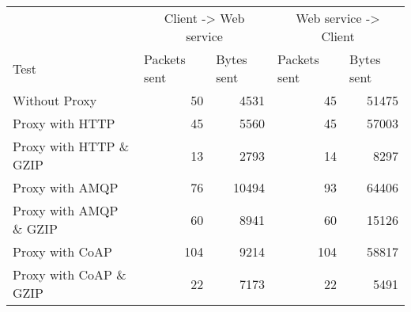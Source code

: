 \begin{tabular}{lrrrr}
\hline
\multicolumn{1}{l}{}                  & \multicolumn{2}{c}{Client -> Web service}                           & \multicolumn{2}{c}{Web service -> Client}                           \\
\multicolumn{1}{l}{Test} & \multicolumn{1}{l}{Packets sent} & \multicolumn{1}{l}{Bytes sent} & \multicolumn{1}{l}{Packets sent} & \multicolumn{1}{l}{Bytes sent} \\ \hline
Without Proxy                   & 50             & 4531           & 45             & 51475          \\
Proxy with HTTP                 & 45             & 5560           & 45             & 57003          \\
Proxy with HTTP \& GZIP         & 13             & 2793           & 14             & 8297           \\
Proxy with AMQP                 & 76             & 10494          & 93             & 64406          \\
Proxy with AMQP \& GZIP         & 60             & 8941           & 60             & 15126          \\
Proxy with CoAP                 & 104            & 9214           & 104            & 58817          \\
Proxy with CoAP \& GZIP         & 22             & 7173           & 22             & 5491           \\
\end{tabular}